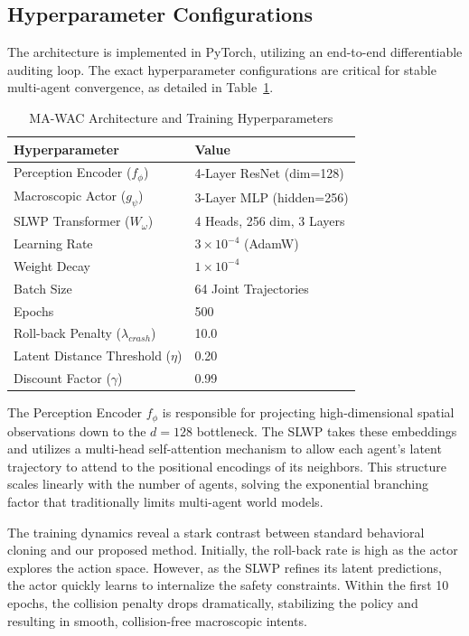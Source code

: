 \documentclass[conference]{IEEEtran}
\begin{document}
\subsection{Hyperparameter Configurations}
The architecture is implemented in PyTorch, utilizing an end-to-end differentiable auditing loop. The exact hyperparameter configurations are critical for stable multi-agent convergence, as detailed in Table~\ref{tab:hyperparams}.

\begin{table}[h]
\centering
\caption{MA-WAC Architecture and Training Hyperparameters}
\label{tab:hyperparams}
\begin{tabular}{@{}l l@{}}
\toprule
\textbf{Hyperparameter} & \textbf{Value} \\
\midrule
Perception Encoder ($f_\phi$) & 4-Layer ResNet (dim=128) \\
Macroscopic Actor ($g_\psi$) & 3-Layer MLP (hidden=256) \\
SLWP Transformer ($W_\omega$) & 4 Heads, 256 dim, 3 Layers \\
Learning Rate & $3 \times 10^{-4}$ (AdamW) \\
Weight Decay & $1 \times 10^{-4}$ \\
Batch Size & 64 Joint Trajectories \\
Epochs & 500 \\
Roll-back Penalty ($\lambda_{crash}$) & 10.0 \\
Latent Distance Threshold ($\eta$) & 0.20 \\
Discount Factor ($\gamma$) & 0.99 \\
\bottomrule
\end{tabular}
\end{table}

The Perception Encoder $f_\phi$ is responsible for projecting high-dimensional spatial observations down to the $d=128$ bottleneck. The SLWP takes these embeddings and utilizes a multi-head self-attention mechanism to allow each agent's latent trajectory to attend to the positional encodings of its neighbors. This structure scales linearly with the number of agents, solving the exponential branching factor that traditionally limits multi-agent world models.

The training dynamics reveal a stark contrast between standard behavioral cloning and our proposed method. Initially, the roll-back rate is high as the actor explores the action space. However, as the SLWP refines its latent predictions, the actor quickly learns to internalize the safety constraints. Within the first 10 epochs, the collision penalty drops dramatically, stabilizing the policy and resulting in smooth, collision-free macroscopic intents.
\end{document}
